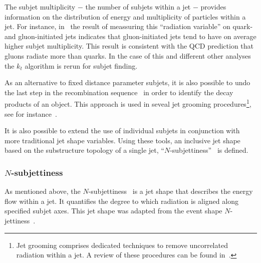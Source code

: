 The subjet multiplicity $-$ the number of subjets within a jet $-$ provides information on the distribution of energy and multiplicity of particles within a jet. For instance, in~\cite{Snihur1999494} the result of meassuring this ``radiation variable'' on quark- and gluon-initiated jets indicates that gluon-initiated jets tend to have on average higher subjet multiplicity. This result is consistent with the QCD prediction that gluons radiate more than quarks. In the case of this and different other analyses %
the $k_t$ algorithm is rerun for subjet finding.

As an alternative to fixed distance parameter subjets, it is also possible to undo the last step in the recombination sequence~\cite{kt2} in order to identify the decay products of an object.  This approach is used in seveal jet grooming procedures\footnote{Jet grooming comprises dedicated techniques to remove uncorrelated radiation within a jet. A review of these procedures can be found in~\cite{Abdesselam:2010pt}. }, see for instance~\cite{pruning}.


It is also possible to extend the use of individual subjets in conjunction with more traditional jet shape variables. Using these tools, an inclusive jet shape based on the substructure topology of a single jet, ``$N$-subjettiness''~\cite{nsubjettiness} is defined.





\subsubsection{$N$-subjettiness}

As mentioned above, the $N$-subjettiness~\cite{nsubjettiness} is a jet shape that describes the energy flow within a jet. It quantifies the degree to which  radiation is aligned along specified subjet axes. This jet shape was adapted from the event shape $N$-jettiness~\cite{njetti}.

